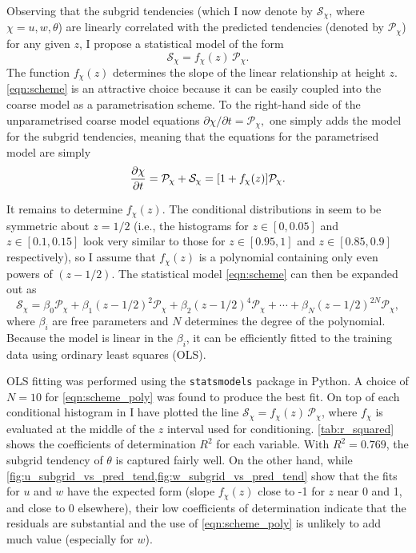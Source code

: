 \documentclass[../main.tex]{subfiles}
\begin{document}
Observing that the subgrid tendencies (which I now denote by
$\mathcal{S}_\chi$, where $\chi = u, w, \theta$) are linearly correlated with
the predicted tendencies (denoted by $\mathcal{P}_\chi$) for any given $z$, I
propose a statistical model of the form
\begin{equation} \label{eqn:scheme}
    \mathcal{S}_\chi =  f_\chi(z)\,\mathcal{P}_\chi.
\end{equation}
The function $f_\chi(z)$ determines the slope of the linear relationship at
height $z$. \cref{eqn:scheme} is an attractive choice because it can be easily
coupled into the coarse model as a parametrisation scheme. To the right-hand
side of the unparametrised coarse model equations $\partial \chi/\partial t =
\mathcal{P}_\chi,$ one simply adds the model for the subgrid tendencies,
meaning that the equations for the parametrised model are simply
\begin{equation} \label{eqn:res_tend_parametrised_model}
    \frac{\partial \chi}{\partial t} = \mathcal{P}_\chi + \mathcal{S}_\chi
        = [1 + f_\chi(z)] \mathcal{P}_\chi.
\end{equation}

It remains to determine $f_\chi(z)$. The conditional distributions in
seem to be symmetric about $z=1/2$ (i.e., the histograms for $z \in [0, 0.05]$
and $z \in [0.1, 0.15]$ look very similar to those for $z \in [0.95, 1]$ and $z
\in [0.85, 0.9]$ respectively), so I assume that $f_\chi(z)$ is a polynomial
containing only even powers of $(z - 1/2)$. The statistical model
\cref{eqn:scheme} can then be expanded out as
\begin{equation} \label{eqn:scheme_poly}
    \mathcal{S}_\chi =
        \beta_0 \mathcal{P}_\chi + \beta_1 (z - 1/2)^2 \mathcal{P}_\chi
        + \beta_2 (z - 1/2)^4 \mathcal{P}_\chi + \cdots
        + \beta_N (z - 1/2)^{2N} \mathcal{P}_\chi,
\end{equation}
where $\beta_i$ are free parameters and $N$ determines the degree of the
polynomial. Because the model is linear in the $\beta_i$, it can be
efficiently fitted to the training data using ordinary least squares (OLS).

OLS fitting was performed using the \texttt{statsmodels} package in Python. A
choice of $N = 10$ for \cref{eqn:scheme_poly} was found to produce the best
fit. On top of each conditional histogram in
I have plotted the line $\mathcal{S}_\chi =  f_\chi(z)\,\mathcal{P}_\chi$,
where $f_\chi$ is evaluated at the middle of the $z$ interval used for
conditioning. \cref{tab:r_squared} shows the coefficients of determination
$R^2$ for each variable. With $R^2 = 0.769$, the subgrid tendency of $\theta$
is captured fairly well. On the other hand, while
\cref{fig:u_subgrid_vs_pred_tend,fig:w_subgrid_vs_pred_tend} show that the fits
for $u$ and $w$ have the expected form (slope $f_\chi(z)$ close to -1 for $z$
near 0 and 1, and close to 0 elsewhere), their low coefficients of
determination indicate that the residuals are substantial and the use of
\cref{eqn:scheme_poly} is unlikely to add much value (especially for $w$).
\end{document}
